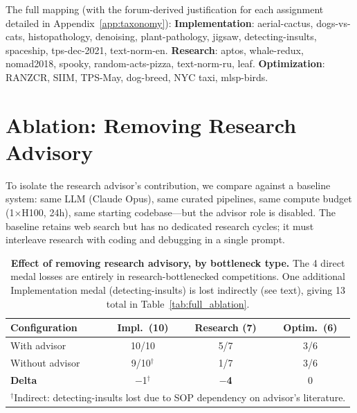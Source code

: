 \documentclass{article}
\begin{document}
\noindent The full mapping (with the forum-derived justification for each assignment detailed in Appendix~\ref{app:taxonomy}): \textbf{Implementation}: aerial-cactus, dogs-vs-cats, histopathology, denoising, plant-pathology, jigsaw, detecting-insults, spaceship, tps-dec-2021, text-norm-en. \textbf{Research}: aptos, whale-redux, nomad2018, spooky, random-acts-pizza, text-norm-ru, leaf. \textbf{Optimization}: RANZCR, SIIM, TPS-May, dog-breed, NYC taxi, mlsp-birds.

\section{Ablation: Removing Research Advisory}
\label{sec:ablation}

To isolate the research advisor's contribution, we compare against a baseline system: same LLM (Claude Opus), same curated pipelines, same compute budget (1$\times$H100, 24h), same starting codebase---but the advisor role is disabled. The baseline retains web search but has no dedicated research cycles; it must interleave research with coding and debugging in a single prompt.

\begin{table}[t]
\centering
\caption{\textbf{Effect of removing research advisory, by bottleneck type.} The 4 direct medal losses are entirely in research-bottlenecked competitions. One additional Implementation medal (detecting-insults) is lost indirectly (see text), giving 13 total in Table~\ref{tab:full_ablation}.}
\label{tab:ablation}
\small
\begin{tabular}{lccc}
\toprule
\textbf{Configuration} & \textbf{Impl.\ (10)} & \textbf{Research (7)} & \textbf{Optim.\ (6)} \\
\midrule
With advisor & 10/10 & 5/7 & 3/6 \\
Without advisor & 9/10$^\dagger$ & 1/7 & 3/6 \\
\midrule
\textbf{Delta} & $-$1$^\dagger$ & \textbf{$-$4} & 0 \\
\bottomrule
\multicolumn{4}{l}{\scriptsize $^\dagger$Indirect: detecting-insults lost due to SOP dependency on advisor's literature.}
\end{tabular}
\end{table}
\end{document}
